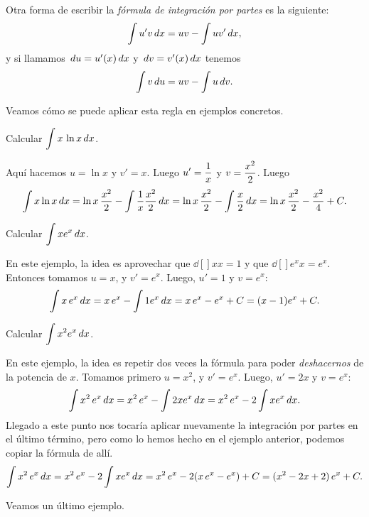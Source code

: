 Otra forma de escribir la \emph{fórmula de integración por partes} es la siguiente:
$$
\int u'v \,dx = uv - \int u v'\,dx,
$$
y si llamamos $\,du = u'(x)\,dx$ y $\,dv = v'(x)\,dx$ tenemos
$$
\int v \,du = uv - \int u \,dv.
$$

Veamos cómo se puede aplicar esta regla en ejemplos concretos.

\begin{example}
  Calcular $\displaystyle\int x\,\ln x\,dx$.

  Aquí hacemos $u=\ln x$ y $v'=x$. Luego $\displaystyle u'=\frac1x$ y $\displaystyle v=\frac{x^2}2$. Luego
  \[
  \int x \ln x\,dx 
  = \ln x \, \frac{x^2}2 - \int \frac1x \frac{x^2}{2}\,dx
  = \ln x \, \frac{x^2}2 - \int \frac{x}{2}\,dx
  = \ln x \, \frac{x^2}2 - \frac{x^2}{4} + C.
  \]  
\end{example}

\begin{example}
  Calcular $\displaystyle \int x e^x\,dx$.

  En este ejemplo, la idea es aprovechar que $\dd[]{x}{x}=1$ y que $\dd[]{e^x}{x}=e^x$. Entonces tomamos $u=x$, y $v'=e^x$. Luego, $u'=1$ y $v=e^x$:
  \[
  \int x\, e^x\,dx = x\,e^x - \int 1 e^x\,dx = x\, e^x - e^x+C = (x-1)e^x+C.
  \]
\end{example}

\begin{example}
  Calcular $\displaystyle \int x^2 e^x\,dx$.

  En este ejemplo, la idea es repetir dos veces la fórmula para poder \emph{deshacernos} de la potencia de $x$. Tomamos primero $u=x^2$, y $v'=e^x$. Luego, $u'=2x$ y $v=e^x$:
  \[
  \int x^2\, e^x\,dx 
  = x^2\,e^x - \int 2x e^x\,dx 
  = x^2\,e^x - 2\int x e^x\,dx .
  \]
  Llegado a este punto nos tocaría aplicar nuevamente la integración por partes en el último término, pero como lo hemos hecho en el ejemplo anterior, podemos copiar la fórmula de allí.
  \[
  \int x^2\, e^x\,dx 
  = x^2\,e^x - 2\int x e^x\,dx 
  = x^2\,e^x - 2(x\, e^x - e^x) + C
  = (x^2-2x+2)\,e^x + C.
  \]
\end{example}

Veamos un último ejemplo.

